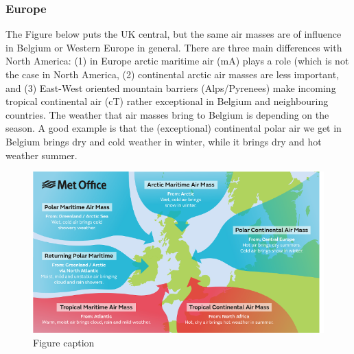 \documentclass[12pt,oneside]{book}
\begin{document}
\subsubsection{Europe}\label{europe}

The Figure below puts the UK central, but the same air masses are of
influence in Belgium or Western Europe in general. There are three main
differences with North America: (1) in Europe arctic maritime air (mA)
plays a role (which is not the case in North America, (2) continental
arctic air masses are less important, and (3) East-West oriented
mountain barriers (Alps/Pyrenees) make incoming tropical continental air
(cT) rather exceptional in Belgium and neighbouring countries. The
weather that air masses bring to Belgium is depending on the season. A
good example is that the (exceptional) continental polar air we get in
Belgium brings dry and cold weather in winter, while it brings dry and
hot weather summer.

\begin{figure}

{\centering \includegraphics[width=0.8\linewidth]{figures/Figure612b} 

}

\caption{Figure caption}\label{fig:Fig612b}
\end{figure}
\end{document}
